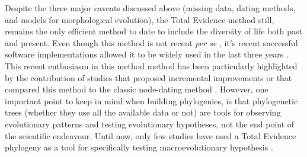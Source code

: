 
Despite the three major caveats discussed above (missing data, dating methods, and models for morphological evolution), the Total Evidence method still, remains the only efficient method to date to include the diversity of life both past and present.
Even though this method is not recent \textit{per se} \citep[e.g.][]{eernissetaxonomic1993}, it's recent successful software implementations \citep{Ronquist2012mrbayes,BEAST2} allowed it to be widely used in the last three years \citep{ronquista2012,slaterphylogenetic2013,Wood01032013,schragocombining2013,beckancient2014,Arcila2015131,Dembo2015,Klopfstein12082015,Carrizo,Wittenberg2015TEM,gavryushkina2015bayesian}.
This recent enthusiasm in this method method has been particularly highlighted by the contribution of studies that proposed incremental improvements \citep{Klopfstein12082015,gavryushkina2015bayesian} or that compared this method to the classic node-dating method \citep{ronquista2012,Arcila2015131}.
However, one important point to keep in mind when building phylogenies, is that phylogenetic trees (whether they use all the available data or not) are tools for observing evolutionary patterns and testing evolutionary hypotheses, not the end point of the scientific endeavour.
Until now, only few studies have used a Total Evidence phylogeny as a tool for specifically testing macroevolutionary hypothesis \citep[e.g.][]{slaterphylogenetic2013,Wood01032013,Dembo2015}.

